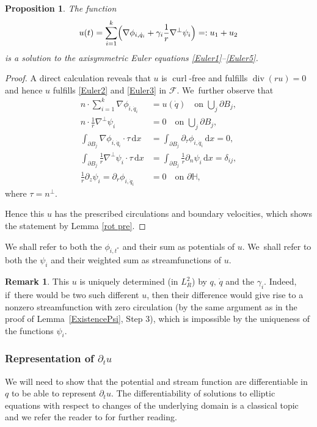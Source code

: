 \documentclass[10pt]{amsart}
\let\ts\textstyle
\newtheorem{proposition}[theorem]{Proposition}
\theoremstyle{definition}
\newtheorem{remark}[theorem]{Remark}
\renewcommand{\div}{\operatorname{div}}
\DeclareMathOperator{\curl}{curl}
\newcommand\eq{=}
\newcommand\dd{\,\mathrm{d}}
\newcommand\dx{\dd x}
\let\de\partial
\begin{document}
\begin{proposition}\label{prop rep u}
The function
\begin{align}\label{u1u2}
u(t)\eq\sum_{i=1}^k\Bigl(\nabla\phi_{i,\dot{q}_i}+\gamma_i\frac{1}{r}\nabla^\perp\psi_i\Bigr)=:u_1+u_2
\end{align}
is a solution to the axisymmetric Euler equations \eqref{Euler1}--\eqref{Euler5}.
\end{proposition}
\begin{proof}
A direct calculation reveals that $u$ is $\curl$-free and fulfills $\div(ru)=0$ and hence $u$ fulfills \eqref{Euler2} and \eqref{Euler3} in $\mathcal{F}$. We~further observe that
\begin{align*}
n\cdot\sum_{i=1}^k\nabla\phi_{i,\dot{q}_i}&\eq u(\dot{q}) \quad\text{on $\ts\bigcup_j\de B_j$},\\
n\cdot\frac{1}{r}\nabla^\perp\psi_i&\eq 0 \quad\text{on $\ts\bigcup_j\de B_j$},\\
\int_{\de B_j}\nabla\phi_{i,\dot{q}_i}\cdot\tau\dx&\eq \int_{\de B_j}\de_\tau\phi_{i,\dot{q}_i}\dx\eq0,\\
\int_{\de B_j}\frac{1}{r}\nabla^\perp\psi_{i}\cdot\tau\dx&\eq \int_{\de B_j}\frac{1}{r}\de_n\psi_{i}\dx\eq\delta_{ij},\\
\frac{1}{r}\de_z\psi_i\eq \de_r\phi_{i,\dot{q}_i}&\eq 0\quad\text{on $\de \mathbb{H}$},
\end{align*}
where $\tau=n^\perp$.

Hence this $u$ has the prescribed circulations and boundary velocities, which shows the statement by Lemma \ref{rot pre}.
\end{proof}

We shall refer to both the $\phi_{i,t^*}$ and their sum as potentials of $u$. We~shall refer to both the $\psi_i$ and their weighted sum as streamfunctions of $u$.

\begin{remark}\label{uunique}
This $u$ is uniquely determined (in $L_R^2$) by $q,\,\dot{q}$ and the $\gamma_i$. Indeed, if~there would be two such different $u$, then their difference would give rise to a nonzero streamfunction with zero circulation (by the same argument as in the proof of Lemma~\ref{ExistencePsi}, Step 3), which is impossible by the uniqueness of the functions $\psi_i$.
\end{remark}

\subsubsection{Representation of $\de_t u$}
We will need to show that the potential and stream function are differentiable in $q$ to be able to represent $\de_tu$. The differentiability of solutions to elliptic equations with respect to changes of the underlying domain is a classical topic and we refer the reader to \cite{sokolowski1992introduction} for further reading.
\end{document}
